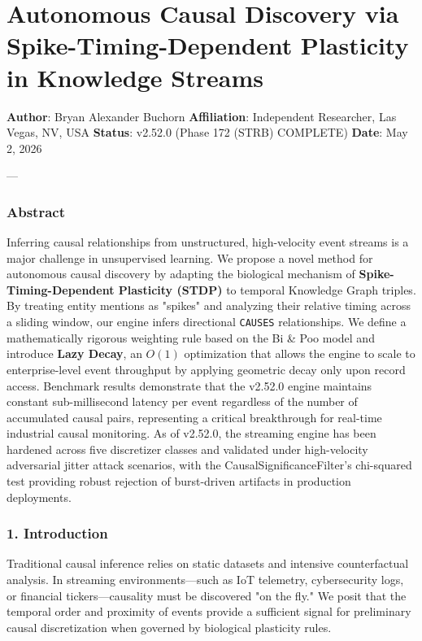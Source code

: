 \section{Autonomous Causal Discovery via Spike-Timing-Dependent Plasticity in Knowledge Streams}

\textbf{Author}: Bryan Alexander Buchorn  
\textbf{Affiliation}: Independent Researcher, Las Vegas, NV, USA  
\textbf{Status}: v2.52.0 (Phase 172 (STRB) COMPLETE)
\textbf{Date}: May 2, 2026

---

\subsubsection{Abstract}
Inferring causal relat\-ionships from unstr\-uctured, high-velocity event streams is a major challenge in unsup\-ervised learning. We propose a novel method for autonomous causal discovery by adapting the biological mechanism of \textbf{Spike-Timing-Dependent Plasticity (STDP)} to temporal Knowledge Graph triples. By treating entity mentions as "spikes" and analyzing their relative timing across a sliding window, our engine infers directional \texttt{CAUSES} relat\-ionships. We define a mathe\-matically rigorous weighting rule based on the Bi \& Poo \cite{bipoo1998} model and introduce \textbf{Lazy Decay}, an $O(1)$ optim\-ization that allows the engine to scale to enterprise-level event throughput by applying geometric decay only upon record access. Benchmark results demonstrate that the v2.52.0 engine maintains constant sub-millisecond latency per event regardless of the number of accumulated causal pairs, repre\-senting a critical break\-through for real-time industrial causal monitoring. As of v2.52.0, the streaming engine has been hardened across five discretizer classes and validated under high-velocity adversarial jitter attack scenarios, with the CausalSignif\-icanceFilter's chi-squared test providing robust rejection of burst-driven artifacts in production deployments.

\subsubsection{1. Introd\-uction}
Traditional causal inference relies on static datasets and intensive count\-erfactual analysis. In streaming envir\-onments—such as IoT telemetry, cyber\-security logs, or financial tickers—causality must be discovered "on the fly." We posit that the temporal order and proximity of events provide a sufficient signal for preliminary causal discr\-etization when governed by biological plasticity rules.

